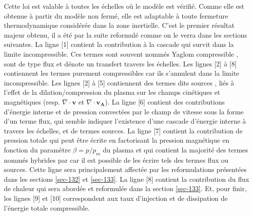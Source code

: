Cette loi  est valable à toutes les échelles où le modèle  est vérifié. Comme elle est obtenue à partir du modèle  non fermé, elle est adaptable à toute fermeture thermodynamique considérée dans la zone inertielle. C'est le premier résultat majeur obtenu, il a été par la suite reformulé comme on le verra dans les sections suivantes. La ligne [1] contient la contribution à la cascade qui survit dans la limite incompressible. Ces termes sont souvent nommés \og Yaglom compressible \fg{}, sont de type flux et dénote un transfert travers les échelles. Les lignes [2] à [8] contiennent les termes purement compressibles car ils s'annulent dans la limite incompressible. Les lignes [2] à [5] contiennent des termes dits \og sources \fg{}, liés à l'effet de la dilation/compression du plasma sur les champs cinétiques et magnétiques (resp. $\nabla \cdot \boldsymbol{v}$ et $\nabla \cdot \boldsymbol{v_A}$). La ligne [6] contient des contributions d'énergie interne et de pression convectées par le champ de vitesse sous la forme d'un terme flux, qui semble indiquer l'existence d'une cascade d'énergie interne à travers les échelles, et de termes sources. La ligne [7] contient la contribution de pression totale qui peut être écrite en factorisant la pression magnétique en fonction du paramètre $\beta = p/p_m$ du plasma et qui contient la majorité des termes nommés \og hybrides \fg{} par \cite{andres_alternative_2017} car il est possible de les écrire tels des termes flux ou sources. Cette ligne sera principalement affectée par les reformulations présentées dans les sections \ref{sec-132} et \ref{sec-133}. La ligne [8] contient la contribution du flux de chaleur qui sera abordée et reformulée dans la section \ref{sec-133}. Et, pour finir, les lignes [9] et [10] correspondent aux taux d'injection et de dissipation de l'énergie totale compressible. 

